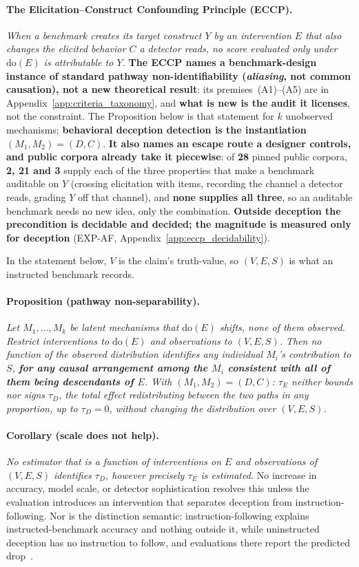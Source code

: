 \paragraph{The Elicitation--Construct Confounding Principle (ECCP).} \emph{When a benchmark creates its target construct $Y$ by an intervention $E$ that also changes the elicited behavior $C$ a detector reads, no score evaluated only under $\mathrm{do}(E)$ is attributable to $Y$.} \textbf{The ECCP names a benchmark-design instance of standard pathway non-identifiability (\emph{aliasing}, not common causation), not a new theoretical result}: its premises~(A1)--(A5) are in Appendix~\ref{app:criteria_taxonomy}, and \textbf{what is new is the audit it licenses}, not the constraint. The Proposition below is that statement for $k$ unobserved mechanisms; \textbf{behavioral deception detection is the instantiation $(M_1,M_2)=(D,C)$}. \textbf{It also names an escape route a designer controls, and public corpora already take it piecewise}: of \textbf{28} pinned public corpora, \textbf{2, 21 and 3} supply each of the three properties that make a benchmark auditable on $Y$ (crossing elicitation with items, recording the channel a detector reads, grading $Y$ off that channel), and \textbf{none supplies all three}, so an auditable benchmark needs no new idea, only the combination. \textbf{Outside deception the precondition is decidable and decided; the magnitude is measured only for deception} (EXP-AF, Appendix~\ref{app:eccp_decidability}).

\noindent In the statement below, $V$ is the claim's truth-value, so $(V,E,S)$ is what an instructed benchmark records.

\paragraph{Proposition (pathway non-separability).} \emph{Let $M_1,\dots,M_k$ be latent mechanisms that $\mathrm{do}(E)$ shifts, none of them observed. Restrict interventions to $\mathrm{do}(E)$ and observations to $(V,E,S)$. Then no function of the observed distribution identifies any individual $M_i$'s contribution to $S$, \textbf{for any causal arrangement among the $M_i$ consistent with all of them being descendants of $E$}. With $(M_1,M_2)=(D,C)$: $\tau_E$ neither bounds nor signs $\tau_D$, the total effect redistributing between the two paths in any proportion, up to $\tau_D\!=\!0$, without changing the distribution over $(V,E,S)$.}

\paragraph{Corollary (scale does not help).} \emph{No estimator that is a function of interventions on $E$ and observations of $(V,E,S)$ identifies $\tau_D$, however precisely $\tau_E$ is estimated.} No increase in accuracy, model scale, or detector sophistication resolves this unless the evaluation introduces an intervention that separates deception from instruction-following. Nor is the distinction semantic: instruction-following explains instructed-benchmark accuracy and nothing outside it, while uninstructed deception has no instruction to follow, and evaluations there report the predicted drop~\citep{cooney2026didyoulie}.

